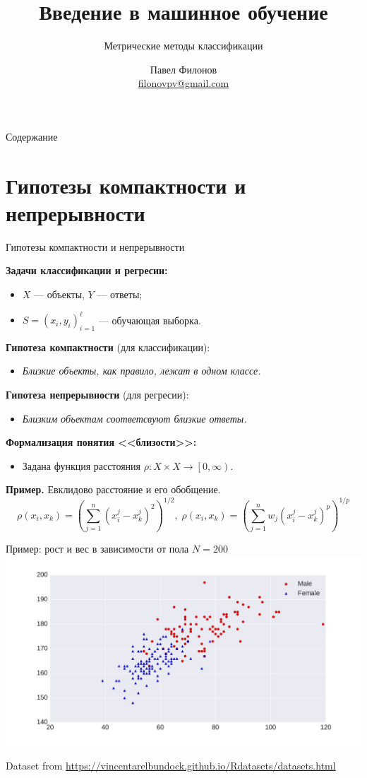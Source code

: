 \documentclass{beamer}
\author{Павел Филонов \\ \href{mailto:filonovpv@gmail.com}{filonovpv@gmail.com}}
\title{Введение в машинное обучение}
\subtitle{Метрические методы классификации}
\begin{document}
\begin{frame}[plain]
    \titlepage
\end{frame}
\begin{frame}[plain]{Содержание}
  \tableofcontents
\end{frame}
\section{Гипотезы компактности и непрерывности}
\begin{frame}{Гипотезы компактности и непрерывности}

{\bf Задачи классификации и регресии:}
\begin{itemize}
    \item[] $X$ --- объекты, $Y$ --- ответы;
    \item[] $S = (x_i, y_i)_{i=1}^{\ell}$ --- обучающая выборка.
\end{itemize}

{\bf Гипотеза компактности} (для классификации):
\begin{itemize}
    \item[] {\it Близкие объекты, как правило, лежат в одном классе.}
\end{itemize}

{\bf Гипотеза непрерывности} (для регресии):
\begin{itemize}
    \item[] {\it Близким объектам соответсвуют близкие ответы.}
\end{itemize}

{\bf Формализация понятия <<близости>>:}
\begin{itemize}
    \item[] Задана функция расстояния $\rho : X \times X \rightarrow \left[ 0, \infty \right)$.
\end{itemize}

{\bf Пример.} Евклидово расстояние и его обобщение.
$$
    \rho(x_i, x_k) = \left(\sum\limits_{j=1}^{n}(x_i^j - x_k^j)^2\right)^{1/2},\;  \rho(x_i, x_k) = \left(\sum\limits_{j=1}^{n}w_j(x_i^j - x_k^j)^p\right)^{1/p}
$$
\end{frame}

\begin{frame}{Пример: рост и вес в зависимости от пола}
$N = 200$
\includegraphics[width=\linewidth]{../fig/height_n_weight.pdf}

\footnotesize
Dataset from \url{https://vincentarelbundock.github.io/Rdatasets/datasets.html}
\end{frame}
\end{document}
